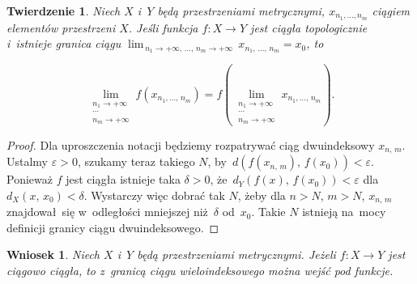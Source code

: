 \documentclass[a4paper,11pt]{article}
\newtheorem{theorem}{Twierdzenie} %
\newtheorem{corollary}{Wniosek}
\begin{document}
\begin{theorem}

  Niech $X$ i~$Y$ będą przestrzeniami metrycznymi,
  $x_{ n_{ 1 }, \ldots, n_{ m } }$ ciągiem elementów przestrzeni $X$.
  Jeśli funkcja $f: X \to Y$ jest ciągła topologicznie i~istnieje
  granica ciągu
  $\lim_{ \, n_{ 1 } \to +\infty, \, \ldots, \, n_{ m } \to +\infty } \, x_{ n_{ 1 }, \, \ldots, \, n_{ m } } = x_{ 0 }$, to

  \begin{equation}
    \label{eq:RS-Vol-I-s01-11}
    \lim\limits_{ \substack{ n_{ 1 } \to +\infty \\ \cdots \\  n_{ m } \to +\infty } }
    f( x_{ n_{ 1 }, \ldots, \, n_{ m } } )
    = f( \lim\limits_{ \substack{ n_{ 1 } \to +\infty \\ \cdots \\ n_{ m } \to
        +\infty } } x_{ n_{ 1 }, \ldots, \, n_{ m } } ).
  \end{equation}

\end{theorem}



\begin{proof}

  Dla uproszczenia notacji będziemy rozpatrywać ciąg dwuindeksowy
  $x_{ n, \, m }$. Ustalmy $\varepsilon > 0$, szukamy teraz takiego $N$,
  by~$d( f( x_{ n, \, m } ),\, f( x_{ 0 } ) ) < \varepsilon$. Ponieważ $f$
  jest ciągła istnieje taka $\delta > 0$, \linebreak
  że~$d_{ Y }( f( x ),\, f( x_{ 0 } ) ) < \varepsilon$
  dla~$d_{ X }( x,\, x_{ 0 } ) < \delta$. Wystarczy więc dobrać tak $N$,
  żeby dla $n > N$, $m > N$, $x_{ n, \, m }$ znajdował~się
  w~odległości mniejszej niż~$\delta$ od~$x_{ 0 }$. Takie $N$ istnieją
  na~mocy definicji granicy ciągu dwuindeksowego.

\end{proof}





\begin{corollary}

  Niech $X$ i~$Y$ będą przestrzeniami metrycznymi. Jeżeli $f: X \to Y$
  jest ciągowo ciągła, to z~granicą ciągu wieloindeksowego można wejść
  pod funkcje.

\end{corollary}
\end{document}
